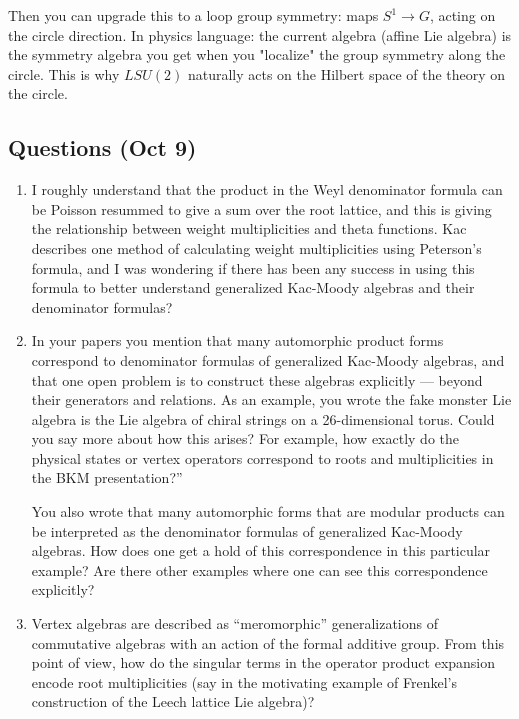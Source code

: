 \documentclass[12pt]{article}
\begin{document}
Then you can upgrade this to a loop group symmetry: maps $S^1 \to G$, acting on the circle direction. In physics language: the current algebra (affine Lie algebra) is the symmetry algebra you get when you "localize" the group symmetry along the circle. This is why $LSU(2)$ naturally acts on the Hilbert space of the theory on the circle.

\subsection*{Questions (Oct 9)}

\begin{enumerate}
    \item I roughly understand that the product in the Weyl denominator formula can be Poisson resummed to give a sum over the root lattice, and this is giving the relationship between weight multiplicities and theta functions. Kac describes one method of calculating weight multiplicities using Peterson's formula, and I was wondering if there has been any success in using this formula to better understand generalized Kac-Moody algebras and their denominator formulas?

    \item In your papers you mention that many automorphic product forms correspond to denominator formulas of generalized Kac-Moody algebras, and that one open problem is to construct these algebras explicitly — beyond their generators and relations.
          As an example, you wrote the fake monster Lie algebra is the Lie algebra of chiral strings on a 26-dimensional torus. Could you say more about how this arises? For example, how exactly do the physical states or vertex operators correspond to roots and multiplicities in the BKM presentation?”

          You also wrote that many automorphic forms that are modular products can be interpreted as the denominator formulas of generalized Kac-Moody algebras. How does one get a hold of this correspondence in this particular example? Are there other examples where one can see this correspondence explicitly?

    \item Vertex algebras are described as “meromorphic”
          generalizations of commutative algebras with an action of the formal additive group. From this point of view, how do the singular terms in the operator product expansion encode root multiplicities (say in the motivating example of Frenkel's construction of the Leech lattice Lie algebra)?


\end{enumerate}
\end{document}
